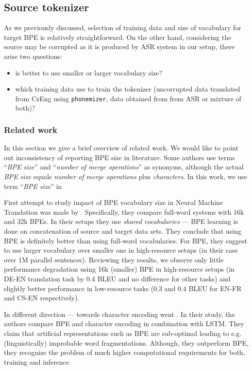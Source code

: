 \subsection{Source tokenizer}
As we previously discussed, selection of training data and size of vocabulary for target BPE is relatively straightforward. On the other hand, considering the source may be corrupted as it is produced by ASR system in our setup, there arise two questions: 

\begin{itemize}
    \item is better to use smaller or larger vocabulary size?
    \item which training data use to train the tokenizer (uncorrupted data translated from CzEng using \texttt{phonemizer}, data obtained from from ASR or mixture of both)?
\end{itemize}

\subsubsection{Related work}
In this section we give a brief overview of related work. We would like to point out inconsistency of reporting BPE size in literature. Some authors use terms ``\textit{BPE size}'' and ``\textit{number of merge operations}'' as synonyms, although the actual \textit{BPE size} equals \textit{number of merge operations} plus \textit{characters}. In this work, we use term ``\textit{BPE size}'' in

First attempt to study impact of BPE vocabulary size in Neural Machine Translation was made by . Specifically, they compare full-word systems with 16k and 32k BPEs. In their setups they use \textit{shared vocabularies} --- BPE learning is done on concatenation of source and target data sets. They conclude that using BPE is definitely better than using full-word vocabularies. For BPE, they suggest to use larger vocabulary over smaller one in high-resource setups (in their case over 1M parallel sentences). Reviewing they results, we observe only little performance degradation using 16k (smaller) BPE in high-resource setups (in DE-EN translation task by 0.4 BLEU and no difference for other tasks) and slightly better performance in low-resource tasks (0.3 and 0.4 BLEU for EN-FR and CS-EN respectively).

In different direction --- towards character encoding went . In their study, the authors compare BPE and character encoding in combination with LSTM. They claim that artificial representations such as BPE are sub-optimal leading to e.g. (linguistically) improbable word fragmentations. Although, they outperform BPE, they recognize the problem of much higher computational requirements for both, training and inference.

